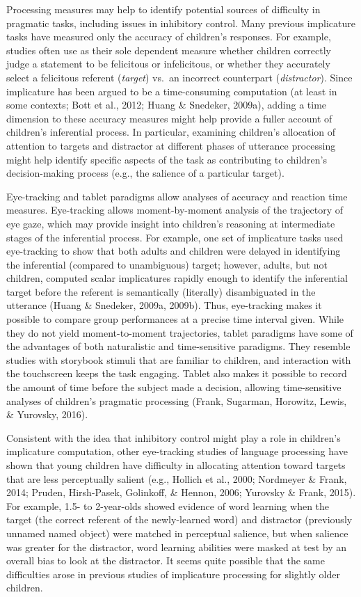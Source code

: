 \documentclass[a4paper,man,apacite,floatsintext]{apa6}
\begin{document}
Processing measures may help to identify potential sources of difficulty
in pragmatic tasks, including issues in inhibitory control. Many
previous implicature tasks have measured only the accuracy of children's
responses. For example, studies often use as their sole dependent
measure whether children correctly judge a statement to be felicitous or
infelicitous, or whether they accurately select a felicitous referent
(\emph{target}) vs.~an incorrect counterpart (\emph{distractor}). Since
implicature has been argued to be a time-consuming computation (at least
in some contexts; Bott et al., 2012; Huang \& Snedeker, 2009a), adding a
time dimension to these accuracy measures might help provide a fuller
account of children's inferential process. In particular, examining
children's allocation of attention to targets and distractor at
different phases of utterance processing might help identify specific
aspects of the task as contributing to children's decision-making
process (e.g., the salience of a particular target).

Eye-tracking and tablet paradigms allow analyses of accuracy and
reaction time measures. Eye-tracking allows moment-by-moment analysis of
the trajectory of eye gaze, which may provide insight into children's
reasoning at intermediate stages of the inferential process. For
example, one set of implicature tasks used eye-tracking to show that
both adults and children were delayed in identifying the inferential
(compared to unambiguous) target; however, adults, but not children,
computed scalar implicatures rapidly enough to identify the inferential
target before the referent is semantically (literally) disambiguated in
the utterance (Huang \& Snedeker, 2009a, 2009b). Thus, eye-tracking
makes it possible to compare group performances at a precise time
interval given. While they do not yield moment-to-moment trajectories,
tablet paradigms have some of the advantages of both naturalistic and
time-sensitive paradigms. They resemble studies with storybook stimuli
that are familiar to children, and interaction with the touchscreen
keeps the task engaging. Tablet also makes it possible to record the
amount of time before the subject made a decision, allowing
time-sensitive analyses of children's pragmatic processing (Frank,
Sugarman, Horowitz, Lewis, \& Yurovsky, 2016).

Consistent with the idea that inhibitory control might play a role in
children's implicature computation, other eye-tracking studies of
language processing have shown that young children have difficulty in
allocating attention toward targets that are less perceptually salient
(e.g., Hollich et al., 2000; Nordmeyer \& Frank, 2014; Pruden,
Hirsh-Pasek, Golinkoff, \& Hennon, 2006; Yurovsky \& Frank, 2015). For
example, 1.5- to 2-year-olds showed evidence of word learning when the
target (the correct referent of the newly-learned word) and distractor
(previously unnamed named object) were matched in perceptual salience,
but when salience was greater for the distractor, word learning
abilities were masked at test by an overall bias to look at the
distractor. It seems quite possible that the same difficulties arose in
previous studies of implicature processing for slightly older children.
\end{document}
